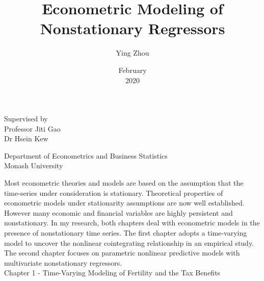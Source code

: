 \documentclass[12pt,a4paper]{article}
\title{Econometric Modeling of Nonstationary Regressors \vspace{2cm}}
\author{Ying Zhou}
\date{February \\ 2020}
\begin{document}
	\maketitle
	\begin{center}
		
		\vspace{3cm}
		{ Supervised by \\ Professor Jiti Gao \\ Dr Hsein Kew }
		
		\vspace{3cm}
		
	\end{center}
	
	\begin{center}
		
		
		{ Department of Econometrics and Business Statistics \\  Monash University}
		
		
	\end{center}
	
%	
	
	\newpage
	
Most econometric theories and models are based on the assumption that the time-series under consideration is stationary. Theoretical properties of econometric models under stationarity assumptions are now well established. However many economic and financial variables are highly persistent and nonstationary. In my research, both chapters deal with econometric models in the presence of nonstationary time series. The first chapter adopts a time-varying model to uncover the nonlinear cointegrating relationship in an empirical study. The second chapter focuses on parametric nonlinear predictive models with multivariate nonstationary regressors.
\\

	
{\LARGE Chapter 1 - Time-Varying Modeling of Fertility and the Tax Benefits}
\end{document}
